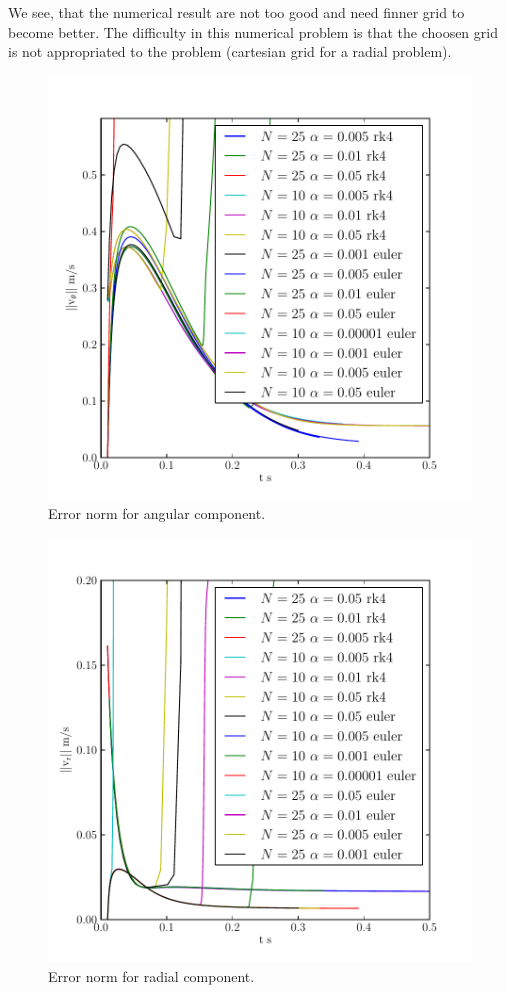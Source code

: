 We see, that the numerical result are not too good and need finner grid to become better.
The difficulty in this numerical problem is that the choosen grid is not appropriated to the problem 
(cartesian grid for a radial problem).


\begin{figure}
\begin{center}
\includegraphics{fixed/normtheta.pdf}
\end{center}
\caption{Error norm for angular component.
}
\label{fix:normtheta}
\end{figure}

\begin{figure}
\begin{center}
\includegraphics{fixed/normr.pdf}
\end{center}
\caption{Error norm for radial component.
}
\label{fix:normr}
\end{figure}


